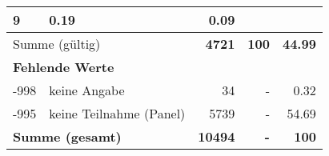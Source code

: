 \begin{longtable}{lXrrr}
       \num{9} &
       \num[round-mode=places,round-precision=2]{0,19} &
         \num[round-mode=places,round-precision=2]{0,09} \\
     \midrule
     \multicolumn{2}{l}{Summe (gültig)} &
       \textbf{\num{4721}} &
     \textbf{100} &
       \textbf{\num[round-mode=places,round-precision=2]{44,99}} \\
     \multicolumn{5}{l}{\textbf{Fehlende Werte}}\\
       -998 &
       keine Angabe &
         \num{34} &
        - &
         \num[round-mode=places,round-precision=2]{0,32} \\
       -995 &
       keine Teilnahme (Panel) &
         \num{5739} &
        - &
         \num[round-mode=places,round-precision=2]{54,69} \\
     \midrule
     \multicolumn{2}{l}{\textbf{Summe (gesamt)}} &
          \textbf{\num{10494}} &
        \textbf{-} &
        \textbf{100} \\
     \bottomrule
     \end{longtable}
     
